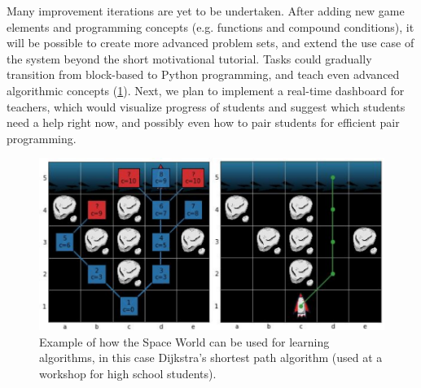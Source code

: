 Many improvement iterations are yet to be undertaken. After adding
new game elements and programming concepts (e.g. functions and compound
conditions), it will be possible to create more advanced problem sets,
and extend the use case of the system beyond the short motivational tutorial.
Tasks could gradually transition from block-based to Python programming,
and teach even advanced algorithmic concepts (\cref{fig:robomission-search-tree}).
Next, we plan to implement a real-time dashboard for teachers,
which would visualize progress %
of students and suggest
which students need a help right now, and possibly even how to pair students
for efficient pair programming.


\begin{figure}[htb]
\centering
\includegraphics[width=\textwidth]{img/robomission-search-tree}
\caption{%
  Example of how the Space World can be used for learning algorithms,
  in this case Dijkstra's shortest path algorithm
  (used at a workshop for high school students).}
\label{fig:robomission-search-tree}
\end{figure}


